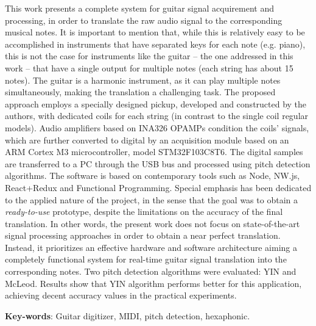 \setlength{\absparsep}{18pt} %

\begin{summary}[Abstract]
This work presents a complete system for guitar signal acquirement and processing, in order to translate
the raw audio signal to the corresponding musical notes. It is important to mention that, while this is
relatively easy to be accomplished in instruments that have separated keys for each note (e.g. piano),
this is not the case for instruments like the guitar – the one addressed in this work – that have a single
output for multiple notes (each string has about 15 notes). The guitar is a harmonic instrument, as it can
play multiple notes simultaneously, making the translation a challenging task. The proposed approach
employs a specially designed pickup, developed and constructed by the authors, with dedicated coils for
each string (in contrast to the single coil regular models). Audio amplifiers based on INA326 OPAMPs
condition the coils’ signals, which are further converted to digital by an acquisition module based on an
ARM Cortex M3 microcontroller, model STM32F103C8T6. The digital samples are transferred to a PC
through the USB bus and processed using pitch detection algorithms. The software is based on
contemporary tools such as Node, NW.js, React+Redux and Functional Programming. Special emphasis
has been dedicated to the applied nature of the project, in the sense that the goal was to obtain a
\emph{ready-to-use} prototype, despite the limitations on the accuracy of the final translation. In other
words, the present work does not focus on state-of-the-art signal processing approaches in order to
obtain a near perfect translation. Instead, it prioritizes an effective hardware and software architecture
aiming a completely functional system for real-time guitar signal translation into the corresponding
notes. Two pitch detection algorithms were evaluated: YIN and McLeod. Results show that YIN algorithm
performs better for this application, achieving decent accuracy values in the practical experiments.


  \textbf{Key-words}: Guitar digitizer, MIDI, pitch detection, hexaphonic.
\end{summary}

%
%

